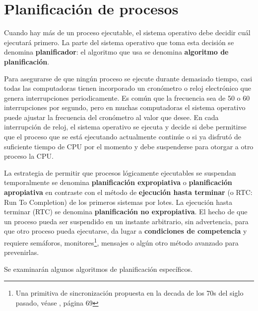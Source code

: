 \documentclass{article}
\begin{document}
\section{Planif\/icaci\'on de procesos}
Cuando hay m\'as de un proceso ejecutable, el sistema operativo 
debe decidir cu\'al ejecutar\'a primero. La parte del sistema operativo 
que toma esta decisi\'on se denomina {\bf planif\/icador}: el algoritmo 
que usa se denomina {\bf algoritmo de planif\/icaci\'on}.

Para asegurarse de que ning\'un proceso se ejecute durante demasiado 
tiempo, casi todas las computadoras tienen incorporado un cron\'ometro 
o reloj electr\'onico que genera interrupciones periodicamente. Es com\'un 
que la frecuencia sea de 50 o 60 interrupciones por segundo, pero en muchas 
computadoras el sistema operativo puede ajustar la frecuencia del cron\'ometro 
al valor que desee. En cada interrupci\'on de reloj, el sistema operativo se 
ejecuta y decide si debe permitirse que el proceso que se est\'a ejecutando 
actualmente contin\'ue o si ya disfrut\'o de suf\/iciente tiempo de CPU por 
el momento y debe suspenderse para otorgar a otro proceso la CPU.

La estrategia de permitir que procesos l\'ogicamente ejecutables se 
suspendan temporalmente se denomina {\bf planif\/icaci\'on expropiativa} o 
{\bf planif\/icaci\'on apropiativa} en contraste con el m\'etodo de 
{\bf ejecuci\'on hasta terminar} (o {RTC: Run To Completion}) de los 
primeros sistemas por lotes. La ejecuci\'on hasta terminar (RTC) se 
denomina {\bf planif\/icaci\'on no expropiativa}. El hecho de que un proceso 
pueda ser suspendido en un instante arbitrario, sin advertencia, para que 
otro proceso pueda ejecutarse, da lugar a {\bf condiciones de competencia} y 
requiere sem\'aforos, monitores\footnote{Una primitiva de sincronizaci\'on 
propuesta en la decada de los 70s del siglo pasado, v\'ease \cite{Tanenbaum}, 
p\'agina 69}, mensajes o alg\'un otro m\'etodo avanzado para prevenirlas.  

Se examinar\'an algunos algoritmos de planif\/icaci\'on espec\'if\/icos.
\end{document}
